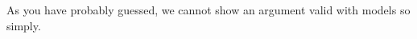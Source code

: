 As you have probably guessed, we cannot show an argument valid with models so simply.



%
%
%
%
%
%
%
%
%
%
%
%
%
